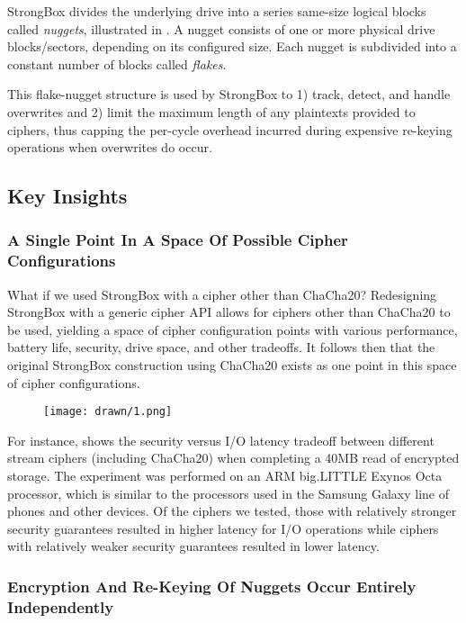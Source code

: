StrongBox divides the underlying drive into a series same-size logical blocks
called \emph{nuggets}, illustrated in . A nugget consists of one
or more physical drive blocks/sectors, depending on its configured size. Each
nugget is subdivided into a constant number of blocks called \emph{flakes}.

This flake-nugget structure is used by StrongBox to 1) track, detect, and handle
overwrites and 2) limit the maximum length of any plaintexts provided to
ciphers, thus capping the per-cycle overhead incurred during expensive re-keying
operations when overwrites do occur.

\subsection{Key Insights}

\subsubsection{A Single Point In A Space Of Possible Cipher Configurations}

What if we used StrongBox with a cipher other than ChaCha20? Redesigning
StrongBox with a generic cipher API allows for ciphers other than ChaCha20 to be
used, yielding a space of cipher configuration points with various performance,
battery life, security, drive space, and other tradeoffs. It follows then that
the original StrongBox construction using ChaCha20 exists as one point in this
space of cipher configurations.

\begin{figure}[ht]
   \centering
   \texttt{[image: drawn/1.png]}
   \caption{}\label{fig:40mb-read}
\end{figure}

For instance,  shows the security versus I/O latency tradeoff
between different stream ciphers (including ChaCha20) when completing a 40MB
read of encrypted storage. The experiment was performed on an ARM big.LITTLE
Exynos Octa processor, which is similar to the processors used in the Samsung
Galaxy line of phones and other devices. Of the ciphers we tested, those with
relatively stronger security guarantees resulted in higher latency for I/O
operations while ciphers with relatively weaker security guarantees resulted in
lower latency.

\subsubsection{Encryption And Re-Keying Of Nuggets Occur Entirely Independently}

